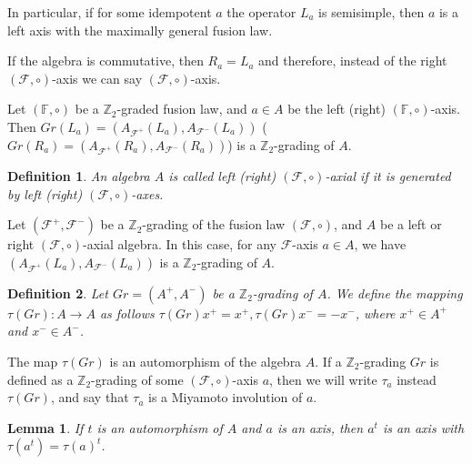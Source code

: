 \documentclass[12pt]{article}
\newcommand\F{\mathbb{F}}
\newcommand\Z{\mathbb{Z}}
\newcommand\cF{\mathcal{F}}
\newtheorem{lem}{Lemma}
\newtheorem{defi}{Definition}
\begin{document}
In particular, if for some idempotent $a$ the operator $L_a$ is semisimple, then $a$ is a left axis with the maximally general fusion law.
    
If the algebra is commutative, then $R_a=L_a$ and therefore, instead of the right $(\mathcal{F},\circ)$-axis we can say $(\mathcal{F},\circ)$-axis.

Let $(\F,\circ)$ be a $\Z_2$-graded fusion law, and $a\in A$ be the left (right) $(\F,\circ)$-axis. Then $Gr(L_a)=(A_{\cF^+}(L_a),A_{\cF^-}(L_a))$ ($Gr(R_a)=(A_{\cF^+}(R_a),A_{\cF^-}(R_a))$) is a $\Z_2$-grading of $A$.

\begin{defi}	
An algebra $A$ is called left (right) $(\cF,\circ)$-axial if it is generated by left (right) $(\cF,\circ)$-axes.
\end{defi}


Let $(\cF^+,\cF^-)$ be a $\Z_2$-grading of the fusion law $(\cF,\circ)$, and $A$ be a left or right $(\cF,\circ)$-axial algebra. In this case, for any $\cF$-axis $a\in A$, we have $(A_{\cF^+}(L_a), A_{\cF^-}(L_a))$ is a $\Z_2$-grading of $A$.


\begin{defi}
Let $Gr=(A^+,A^-)$ be a $\Z_2$-grading of $A$. We define the mapping $\tau(Gr):A\rightarrow A$ as follows $\tau(Gr)x^+=x^+, \tau(Gr)x^-=-x^-$, where $x^+\in A^{+}$ and $x^-\in A^{-}$. 
\end{defi}

The map $\tau(Gr)$ is an automorphism of the algebra $A$.
If a $\Z_2$-grading $Gr$ is defined as a $\Z_2$-grading of some $(\mathcal{F},\circ)$-axis $a$, then we will write $\tau_a$ instead $\tau(Gr)$, and say that $\tau_a$ is a Miyamoto involution of $a$.
\begin{lem}\cite[Lemma 5.1]{HRS2}\label{tauaut}
If $t$ is an automorphism of $A$ and $a$ is an axis, then $a^t$ is an axis with
$\tau(a^t) = \tau(a)^t$.
\end{lem}
\end{document}
